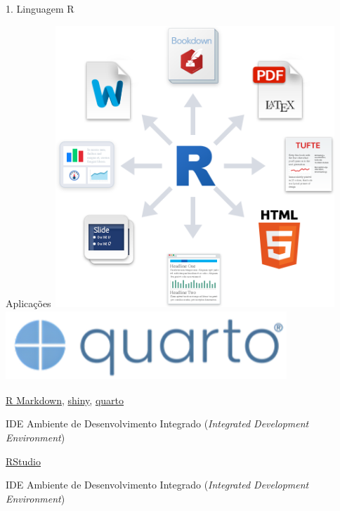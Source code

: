 \documentclass[
  ignorenonframetext,
]{beamer}
\begin{document}
\begin{frame}{1. Linguagem R}
\begin{block}{Aplicações}
\includegraphics[width=4.16667in,height=4.16667in]{img/r_markdown_output_formats.png}
\includegraphics[width=4.16667in,height=1.04167in]{img/quarto.png}

\href{https://rmarkdown.rstudio.com/}{R Markdown},
\href{https://shiny.rstudio.com/}{shiny},
\href{https://quarto.org/}{quarto}
\end{block}

\begin{block}{IDE}
\protect\hypertarget{ide}{}
Ambiente de Desenvolvimento Integrado (\emph{Integrated Development
Environment})

\href{https://posit.co/downloads/}{RStudio}
\end{block}

\begin{block}{IDE}
\protect\hypertarget{ide-1}{}
Ambiente de Desenvolvimento Integrado (\emph{Integrated Development
Environment})


\end{block}
\end{frame}
\end{document}
